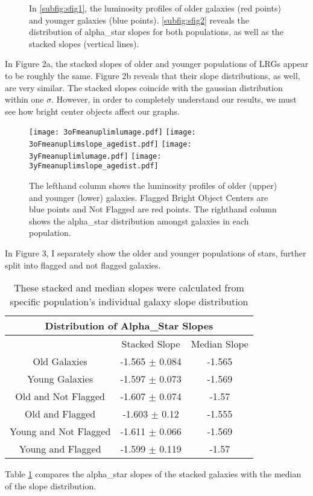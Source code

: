 \documentclass{article}
\begin{document}
\begin{figure}[ht!]
\hfill
{}
 \caption{In \ref{subfig:sfig1}, the luminosity profiles of older galaxies (red points) and younger galaxies (blue points). \ref{subfig:sfig2} reveals the distribution of alpha\_star slopes for both populations, as well as the stacked slopes (vertical lines).}
\label{fig:mesh2}
\end{figure}


In Figure 2a, the stacked slopes of older and younger populations of LRGs appear to be roughly the same. Figure 2b reveals that their slope distributions, as well, are very similar.  The stacked slopes coincide with the gaussian distribution within one $\sigma$. However, in order to completely understand our results, we must see how bright center objects affect our graphs.

\begin{figure*}[H!]
\texttt{[image: 3oFmeanuplimlumage.pdf]}
\label{subfig:sfig3}
\texttt{[image: 3oFmeanuplimslope\_agedist.pdf]}
\label{subfig:sfig4}
\texttt{[image: 3yFmeanuplimlumage.pdf]}
\label{subfig:sfig5}
\texttt{[image: 3yFmeanuplimslope\_agedist.pdf]}
\label{subfig:sfig6}
\caption{The left\-hand column shows the luminosity profiles of older (upper) and younger (lower) galaxies. Flagged Bright Object Centers are blue points and Not Flagged are red points. The right\-hand column shows the alpha\_star distribution amongst galaxies in each population.}
\label{fig:mesh3}
\end{figure*}

In Figure 3, I separately show the older and younger populations of stars, further split into flagged and not flagged galaxies.

\begin{table}[H]
\centering
\begin{tabular}{ ||c|c|c|| }
\hline
\multicolumn{3}{||c||}{Distribution of Alpha\_Star Slopes}\\
\hline\hline
   & Stacked Slope & Median Slope \\
\hline
Old Galaxies & -1.565 $\pm$ 0.084 &-1.565 \\
\hline
Young Galaxies &-1.597 $\pm$ 0.073 & -1.569\\
\hline
Old and Not Flagged & -1.607 $\pm$ 0.074 & -1.57\\
\hline
Old and Flagged & -1.603 $\pm$ 0.12 & -1.555\\
\hline
Young and Not Flagged & -1.611 $\pm$ 0.066 & -1.569\\
\hline
Young and Flagged & -1.599 $\pm$ 0.119 & -1.57\\
\hline
\end{tabular}
\caption{These stacked and median slopes were calculated from specific population's individual galaxy slope distribution}
\label{table:2}
\end{table}

Table \ref{table:2} compares the alpha\_star slopes of the stacked galaxies with the median of the slope distribution. 
\end{document}
